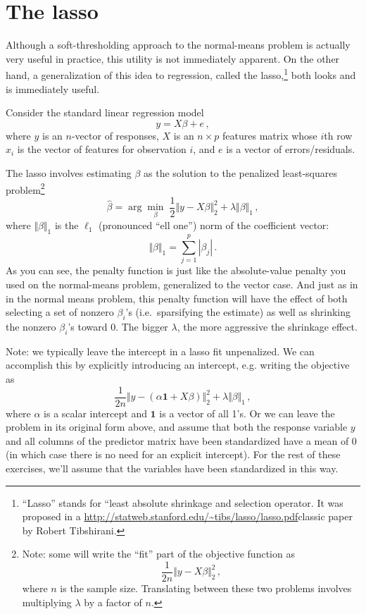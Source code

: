 \documentclass{article}
\begin{document}
\section{The lasso}

Although  a soft-thresholding approach to the normal-means problem is actually very useful in practice, this utility is not immediately apparent.  On the other hand, a generalization of this idea to regression, called the lasso,\footnote{``Lasso'' stands for ``least absolute shrinkage and selection operator.  It was proposed in a \url{http://statweb.stanford.edu/~tibs/lasso/lasso.pdf}{classic paper} by Robert Tibshirani.} both looks and is immediately useful.

Consider the standard linear regression model
$$
y = X \beta + e \, ,
$$
where $y$ is an $n$-vector of responses, $X$ is an $n \times p$ features matrix whose $i$th row $x_i$ is the vector of features for observation $i$, and $e$ is a vector of errors/residuals.

The lasso involves estimating $\beta$ as the solution to the penalized least-squares problem\footnote{Note: some will write the ``fit'' part of the objective function as
$$
\frac{1}{2n} \Vert y - X \beta \Vert_2^2 \, ,
$$
where $n$ is the sample size.  Translating between these two problems involves multiplying $\lambda$ by a factor of $n$.
}
$$
\hat{\beta} = \arg \min_{\beta} \; \frac{1}{2} \Vert y - X \beta \Vert_2^2 + \lambda \Vert \beta \Vert_1 \, ,
$$
where $\Vert \beta \Vert_1$ is the $\ell_1$ (pronounced ``ell one'') norm of the coefficient vector:
$$
\Vert \beta \Vert_1 = \sum_{j=1}^p |\beta_j| \, .
$$
As you can see, the penalty function is just like the absolute-value penalty you used on the normal-means problem, generalized to the vector case.  And just as in in the normal means problem, this penalty function will have the effect of both selecting a set of nonzero $\beta_i$'s (i.e.~sparsifying the estimate) as well as shrinking the nonzero $\beta_i$'s toward 0.  The bigger $\lambda$, the more aggressive the shrinkage effect.

Note: we typically leave the intercept in a lasso fit unpenalized.  We can accomplish this by explicitly introducing an intercept, e.g. writing the objective as
$$
\frac{1}{2n} \Vert y - (\alpha \mathbf{1} + X \beta) \Vert_2^2 + \lambda \Vert \beta \Vert_1 \, ,
$$
where $\alpha$ is a scalar intercept and $\mathbf{1}$ is a vector of all 1's.  Or we can leave the problem in its original form above, and assume that both the response variable $y$ and all columns of the predictor matrix have been standardized have a mean of 0 (in which case there is no need for an explicit intercept).  For the rest of these exercises, we'll assume that the variables have been standardized in this way.
\end{document}
